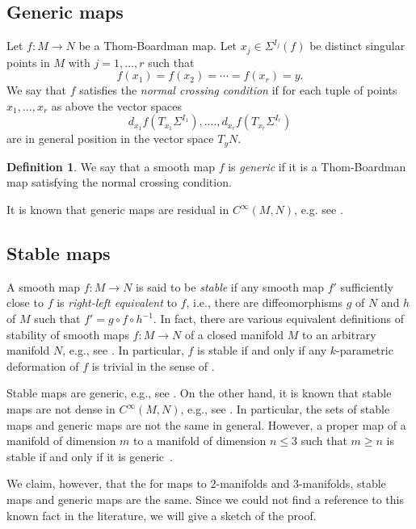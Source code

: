 \documentclass[12pt]{amsart}
\def\co{\colon}
\theoremstyle{definition}
\newtheorem{definition}[theorem]{Definition}
\begin{document}
\subsection{Generic maps}
Let $f\co M\to N$ be a Thom-Boardman map. Let $x_j\in \Sigma^{I_j}(f)$ be distinct singular points in $M$  with $j=1,..., r$ such that 
\[
    f(x_1)=f(x_2)=\cdots =f(x_r)=y.
\]  
We say that $f$ satisfies the \emph{normal crossing condition} if for each tuple of points $x_1,..., x_r$ as above the vector spaces 
\[
     d_{x_1}f(T_{x_1}\Sigma^{I_1}), ...., d_{x_r}f(T_{x_r}\Sigma^{I_r})
\]
are in general position in the vector space $T_yN$. 

\begin{definition} 
We say that a smooth map $f$ is \emph{generic} if it is a Thom-Boardman map satisfying the normal crossing condition. 
\end{definition}

\noindent It is known that generic maps are residual in $C^{\infty}(M, N)$, e.g. see \cite[p.157]{GG}. 

\subsection{Stable maps}\label{s:stable_maps}
A smooth map $f\co M\to N$ is said to be \emph{stable} if any smooth map $f'$ sufficiently close to $f$ is \emph{right-left equivalent} to $f$, i.e., there are diffeomorphisms $g$ of $N$ and $h$ of $M$ such that $f'=g\circ f\circ h^{-1}$. In fact, there are various equivalent definitions of stability of smooth maps  $f\co M\to N$ of a closed manifold $M$ to an arbitrary manifold $N$, e.g., see  \cite[Chapter V, Theorem 7.1]{GG}.  In particular, $f$ is stable if and only if any $k$-parametric deformation of $f$ is trivial in the sense of \cite[Chapter V, Definition 2.3]{GG}.  

Stable maps are generic, e.g., see \cite[Chapter VI, Theorem 5.2]{GG}. On the other hand, 
it is known that stable maps are not dense in $C^{\infty}(M, N)$, e.g., see \cite[p. 160]{GG}. In particular, the sets of stable maps and generic maps are not the same in general. However, a proper map of a manifold of dimension $m$ to a manifold of dimension $n\le 3$ such that $m\ge n$ is stable if and only if it is generic~\cite{MaV}. 

\iffalse
We claim, however, that the for maps to $2$-manifolds and $3$-manifolds, stable maps and generic maps are the same. Since we could not find a reference to this known fact in the literature, we will give a sketch of the proof. 
\end{document}
